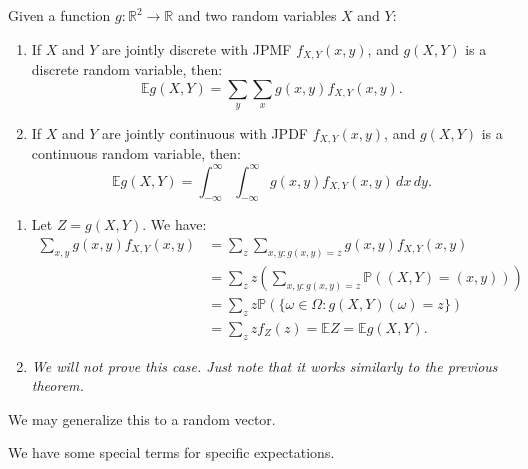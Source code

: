 \documentclass{huhtakm-template-book-v2}
\newcommand{\prob}{\mathbb{P}}
\newcommand{\expect}{\mathbb{E}}
\begin{document}
    \begin{thm}
        Given a function $g:\mathbb{R}^{2} \to \mathbb{R}$ and two random variables $X$ and $Y$:
        \begin{enumerate}
            \item If $X$ and $Y$ are jointly discrete with JPMF $f_{X,Y}(x, y)$, and $g(X,Y)$ is a discrete random variable, then:
            \begin{equation*}
                \expect{g(X,Y)} = \sum_{y}\sum_{x}g(x, y)f_{X,Y}(x, y).
            \end{equation*}
            \item If $X$ and $Y$ are jointly continuous with JPDF $f_{X,Y}(x, y)$, and $g(X,Y)$ is a continuous random variable, then:
            \begin{equation*}
                \expect{g(X,Y)} = \int_{-\infty}^{\infty}\int_{-\infty}^{\infty} g(x, y)f_{X,Y}(x, y)\,dx\,dy.
            \end{equation*}
        \end{enumerate} 
    \end{thm}
    \begin{proofing}
        \begin{enumerate}
            \item Let $Z = g(X,Y)$. We have:
            \begin{align*}
                \sum_{x,y}g(x, y)f_{X,Y}(x, y) &= \sum_{z}\sum_{x,y:g(x, y) = z}g(x, y)f_{X,Y}(x, y)\\
                &= \sum_{z}z\left(\sum_{x,y:g(x, y) = z}\prob((X,Y) = (x, y))\right)\\
                &= \sum_{z}z\prob(\{\omega \in \Omega:g(X,Y)(\omega) = z\})\\
                &= \sum_{z}zf_{Z}(z) = \expect{Z} = \expect{g(X,Y)}.
            \end{align*}
            \item \textit{We will not prove this case. Just note that it works similarly to the previous theorem.}
        \end{enumerate}
    \end{proofing}
    \begin{rem}
        We may generalize this to a random vector. 
    \end{rem}
    We have some special terms for specific expectations.
\end{document}
